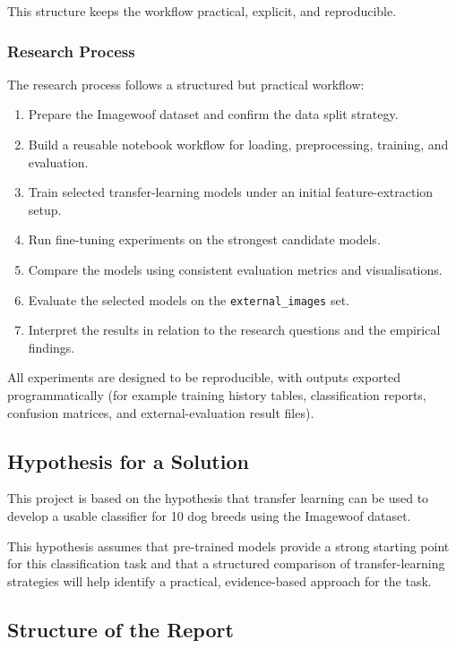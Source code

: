 \documentclass[12pt, a4paper]{article}
\begin{document}
This structure keeps the workflow practical, explicit, and reproducible.

\subsubsection{Research Process}

The research process follows a structured but practical workflow:

\begin{enumerate}
  \item Prepare the Imagewoof dataset and confirm the data split strategy.
  \item Build a reusable notebook workflow for loading, preprocessing, training, and evaluation.
  \item Train selected transfer-learning models under an initial feature-extraction setup.
  \item Run fine-tuning experiments on the strongest candidate models.
  \item Compare the models using consistent evaluation metrics and visualisations.
  \item Evaluate the selected models on the \texttt{external\_images} set.
  \item Interpret the results in relation to the research questions and the empirical findings.
\end{enumerate}

All experiments are designed to be reproducible, with outputs exported programmatically (for example training history tables, classification reports, confusion matrices, and external-evaluation result files).

\subsection{Hypothesis for a Solution}

This project is based on the hypothesis that transfer learning can be used to develop a usable classifier for 10 dog breeds using the Imagewoof dataset.

This hypothesis assumes that pre-trained models provide a strong starting point for this classification task and that a structured comparison of transfer-learning strategies will help identify a practical, evidence-based approach for the task.

\subsection{Structure of the Report}
\end{document}

